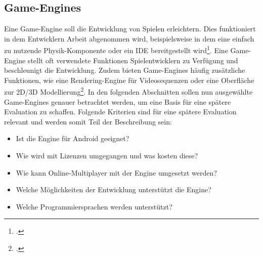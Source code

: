 \subsection{Game-Engines}
	Eine Game-Engine soll die Entwicklung von Spielen erleichtern. Dies funktioniert in dem Entwicklern Arbeit abgenommen wird, beispielsweise in dem eine einfach zu nutzende Physik-Komponente oder ein \gls{IDE} bereitgestellt wird\footcite[Jason Gregory - Game Engine Architecture (S.11)]{gregory2014game}. Eine Game-Engine stellt oft verwendete Funktionen Spielentwicklern zu Verfügung und beschleunigt die Entwicklung. Zudem bieten Game-Engines häufig zusätzliche Funktionen, wie eine Rendering-Engine für Videosequenzen oder eine Oberfläche zur 2D/3D Modellierung\footcite[Jason Gregory - Game Engine Architecture (S. 36ff.)]{gregory2014game}.
	In den folgenden Abschnitten sollen nun ausgewählte Game-Engines genauer betrachtet werden, um eine Basis für eine spätere Evaluation zu schaffen. Folgende Kriterien sind für eine spätere Evaluation relevant und werden somit Teil der Beschreibung sein:
	\begin{itemize}
		\item{Ist die Engine für Android geeignet?}
		\item{Wie wird mit Lizenzen umgegangen und was kosten diese?}
		\item{Wie kann Online-Multiplayer mit der Engine umgesetzt werden?}
		\item{Welche Möglichkeiten der Entwicklung unterstützt die Engine?}
		\item{Welche Programmiersprachen werden unterstützt?}
	\end{itemize}

